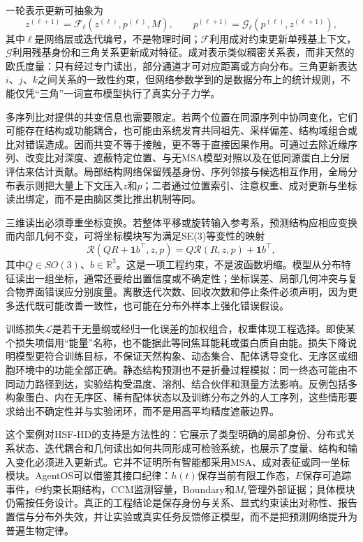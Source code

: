 一轮表示更新可抽象为
\begin{equation}
 z^{(\ell+1)}=\mathcal F_\ell(z^{(\ell)},p^{(\ell)},M),\qquad
 p^{(\ell+1)}=\mathcal G_\ell(p^{(\ell)},z^{(\ell+1)}),
\end{equation}
其中$\ell$是网络层或迭代编号，不是物理时间；$\mathcal F$利用成对约束更新单残基上下文，$\mathcal G$利用残基身份和三角关系更新成对特征。成对表示类似稠密关系表，而非天然的欧氏度量：只有经过专门读出，部分通道才可对应距离或方向分布。三角更新表达$i$、$j$、$k$之间关系的一致性约束，但网络参数学到的是数据分布上的统计规则，不能仅凭“三角”一词宣布模型执行了真实分子力学。

多序列比对提供的共变信息也需要限定。若两个位置在同源序列中协同变化，它们可能存在结构或功能耦合，也可能由系统发育共同祖先、采样偏差、结构域组合或比对错误造成。因而共变不等于接触，更不等于直接因果作用。可通过去除近缘序列、改变比对深度、遮蔽特定位置、与无MSA模型对照以及在低同源蛋白上分层评估来估计贡献。局部结构网络保留残基身份、序列邻接与候选相互作用，全局分布表示则把大量上下文压入$z$和$p$；二者通过位置索引、注意权重、成对更新与坐标读出绑定，而不是由脑区类比推出机制等同。

三维读出必须尊重坐标变换。若整体平移或旋转输入参考系，预测结构应相应变换而内部几何不变，可将坐标模块写为满足SE(3)等变性的映射
\begin{equation}
 \mathcal R(QR+\mathbf 1b^\top,z,p)=Q\mathcal R(R,z,p)+\mathbf 1b^\top,
\end{equation}
其中$Q\in SO(3)$、$b\in\mathbb R^3$。这是一项工程约束，不是波函数坍缩。模型从分布特征读出一组坐标，通常还要给出置信度或不确定性；坐标误差、局部几何冲突与复合物界面错误应分别度量。离散迭代次数、回收次数和停止条件必须声明，因为更多迭代既可能改善一致性，也可能在分布外样本上强化错误假设。

训练损失$\mathcal L$是若干无量纲或经归一化误差的加权组合，权重体现工程选择。即使某个损失项借用“能量”名称，也不能据此等同焦耳能耗或蛋白质自由能。损失下降说明模型更符合训练目标，不保证天然构象、动态集合、配体诱导变化、无序区或细胞环境中的功能全部正确。静态结构预测也不是折叠过程模拟：同一终态可能由不同动力路径到达，实验结构受温度、溶剂、结合伙伴和测量方法影响。反例包括多构象蛋白、内在无序区、稀有配体状态以及训练分布之外的人工序列，这些情形要求给出不确定性并与实验闭环，而不是用高平均精度遮蔽边界。

这个案例对HSF-HD的支持是方法性的：它展示了类型明确的局部身份、分布式关系状态、迭代耦合和几何读出如何共同形成可检验系统，也展示了度量、结构和输入变化必须进入更新式。它并不证明所有智能都采用MSA、成对表征或同一坐标模块。AgentOS可以借鉴其接口纪律：$h(t)$保存当前有限工作态，$E$保存可追踪事件，$\Theta$约束长期结构，CCM监测容量，Boundary和$M_e$管理外部证据；具体模块仍需按任务设计。真正的工程结论是保存身份与关系、显式约束读出对称性、报告置信与分布外失效，并让实验或真实任务反馈修正模型，而不是把预测网络提升为普遍生物定律。

